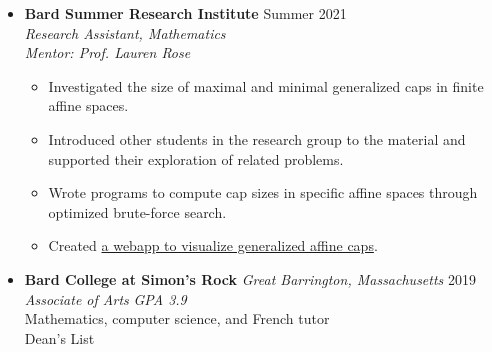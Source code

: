 \documentclass[12pt,letterpaper]{article}
\newenvironment{explist}
{\begin{itemize}[label=\textbf{--},itemsep=1pt,topsep=0pt,partopsep=0pt,parsep=0pt]}
{\end{itemize}}
\begin{document}
\begin{itemize}[label=]
    \item
        \textbf{Bard Summer Research Institute} \hfill Summer 2021\\
        \textit{Research Assistant, Mathematics}\\
        \textit{Mentor: Prof. Lauren Rose}
        \begin{explist}
        \item Investigated the size of maximal and minimal generalized caps in finite affine spaces.
        \item Introduced other students in the research group to the material and supported their exploration of related problems.
        \item Wrote programs to compute cap sizes in specific affine spaces through optimized brute-force search.
        \item Created \href{https://slickytail.github.io/QuadsVis/index.html}{a webapp to visualize generalized affine caps}.
        \end{explist}

    \item
        \textbf{Bard College at Simon's Rock} \textit{Great Barrington, Massachusetts} \hfill 2019\\
        \textit{Associate of Arts} \hfill \textit{GPA 3.9}\\
        Mathematics, computer science, and French tutor\\
        Dean's List

\end{itemize}
\end{document}
